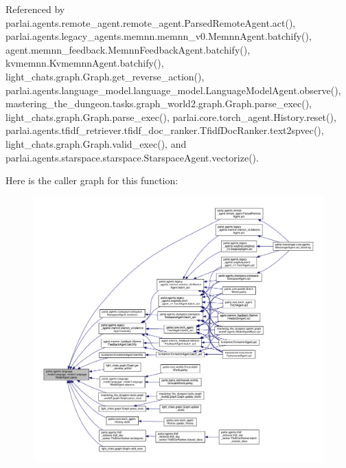 Referenced by parlai.\+agents.\+remote\+\_\+agent.\+remote\+\_\+agent.\+Parsed\+Remote\+Agent.\+act(), parlai.\+agents.\+legacy\+\_\+agents.\+memnn.\+memnn\+\_\+v0.\+Memnn\+Agent.\+batchify(), agent.\+memnn\+\_\+feedback.\+Memnn\+Feedback\+Agent.\+batchify(), kvmemnn.\+Kvmemnn\+Agent.\+batchify(), light\+\_\+chats.\+graph.\+Graph.\+get\+\_\+reverse\+\_\+action(), parlai.\+agents.\+language\+\_\+model.\+language\+\_\+model.\+Language\+Model\+Agent.\+observe(), mastering\+\_\+the\+\_\+dungeon.\+tasks.\+graph\+\_\+world2.\+graph.\+Graph.\+parse\+\_\+exec(), light\+\_\+chats.\+graph.\+Graph.\+parse\+\_\+exec(), parlai.\+core.\+torch\+\_\+agent.\+History.\+reset(), parlai.\+agents.\+tfidf\+\_\+retriever.\+tfidf\+\_\+doc\+\_\+ranker.\+Tfidf\+Doc\+Ranker.\+text2spvec(), light\+\_\+chats.\+graph.\+Graph.\+valid\+\_\+exec(), and parlai.\+agents.\+starspace.\+starspace.\+Starspace\+Agent.\+vectorize().

Here is the caller graph for this function\+:
\nopagebreak
\begin{figure}[H]
\begin{center}
\leavevmode
\includegraphics[width=350pt]{classparlai_1_1agents_1_1language__model_1_1language__model_1_1LanguageModelAgent_ad67bbe760648032c08da9400bb2e3da1_icgraph}
\end{center}
\end{figure}
\mbox{\label{classparlai_1_1agents_1_1language__model_1_1language__model_1_1LanguageModelAgent_a1ff4e6849d50eb9d58a2f97a91d715ce}} 
